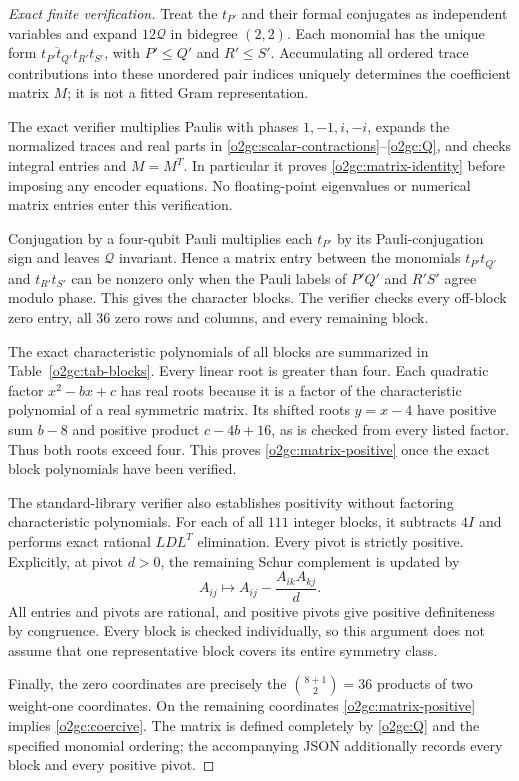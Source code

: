 \documentclass[11pt]{article}
\theoremstyle{definition}
\begin{document}
\begin{proof}[Exact finite verification]
Treat the \(t_{P'}\) and their formal conjugates as independent
variables and expand \(12\mathcal Q\) in bidegree \((2,2)\).
Each monomial has the unique form
\(\overline{t_{P'}t_{Q'}}t_{R'}t_{S'}\), with \(P'\le Q'\) and
\(R'\le S'\). Accumulating all ordered trace contributions into
these unordered pair indices uniquely determines the coefficient
matrix \(M\); it is not a fitted Gram representation.

The exact verifier multiplies Paulis with phases \(1,-1,i,-i\),
expands the normalized traces and real parts in
\eqref{o2gc:scalar-contractions}--\eqref{o2gc:Q}, and checks integral
entries and \(M=M^T\). In particular it proves
\eqref{o2gc:matrix-identity} before imposing any encoder equations.
No floating-point eigenvalues or numerical matrix entries enter
this verification.

Conjugation by a four-qubit Pauli multiplies each \(t_{P'}\) by its
Pauli-conjugation sign and leaves \(\mathcal Q\) invariant. Hence a
matrix entry between the monomials \(t_{P'}t_{Q'}\) and
\(t_{R'}t_{S'}\) can be nonzero only when the Pauli labels of
\(P'Q'\) and \(R'S'\) agree modulo phase. This gives the character
blocks. The verifier checks every off-block zero entry, all \(36\)
zero rows and columns, and every remaining block.

The exact characteristic polynomials of all blocks are summarized
in Table~\ref{o2gc:tab-blocks}. Every linear root is greater than
four. Each quadratic factor \(x^2-bx+c\) has real roots because it
is a factor of the characteristic polynomial of a real symmetric
matrix. Its shifted roots \(y=x-4\) have positive sum \(b-8\) and
positive product \(c-4b+16\), as is checked from every listed factor.
Thus both roots exceed four. This proves
\eqref{o2gc:matrix-positive} once the exact block polynomials have
been verified.

The standard-library verifier also establishes positivity without
factoring characteristic polynomials. For each of all \(111\)
integer blocks, it subtracts \(4I\) and performs exact rational
\(LDL^T\) elimination. Every pivot is strictly positive. Explicitly,
at pivot \(d>0\), the remaining Schur complement is updated by
\[
 A_{ij}\longmapsto A_{ij}-\frac{A_{ik}A_{kj}}{d}.
\]
All entries and pivots are rational, and positive pivots give positive
definiteness by congruence. Every block is checked individually, so
this argument does not assume that one representative block covers
its entire symmetry class.

Finally, the zero coordinates are precisely the
\(\binom{8+1}{2}=36\) products of two weight-one coordinates.
On the remaining coordinates \eqref{o2gc:matrix-positive} implies
\eqref{o2gc:coercive}. The matrix is defined completely by
\eqref{o2gc:Q} and the specified monomial ordering; the accompanying
JSON additionally records every block and every positive pivot.
\end{proof}
\end{document}
